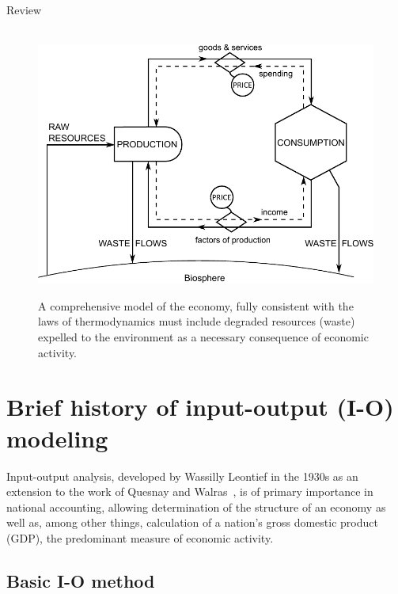 Review \cite{F-K2003}

\cite{F-K1998}\cite{ConAccount1998}\cite{Giampietro2000}\cite{Daniels2001}\cite{Ayres2002}\cite{Haberl2001}
\cite{Giampietro2013}

\begin{figure}[!ht]
\centering\
\includegraphics[width=\linewidth]{Part_0/Chapter_Introduction/images/PERKS.pdf}
\caption[A comprehensive biophysical (**** ? ****) model of the economy]{A comprehensive model 
of the economy, fully consistent with the laws of thermodynamics 
must include degraded resources (waste) expelled 
to the environment as a necessary consequence of economic activity.}
\label{fig:metabolic_economy}
\end{figure}

\section{Brief history of input-output (I-O) modeling}
\label{sec:history}

Input-output analysis, developed by Wassilly Leontief in the 1930s 
as an extension to the work of Quesnay and Walras~\cite{Leontief1936}, 
is of primary importance in national accounting, 
allowing determination of the structure of an economy as well as, 
among other things, 
calculation of a nation's gross domestic product (GDP), 
the predominant measure of economic activity.







\subsection{Basic I-O method}
\label{sec:IO_basic}

